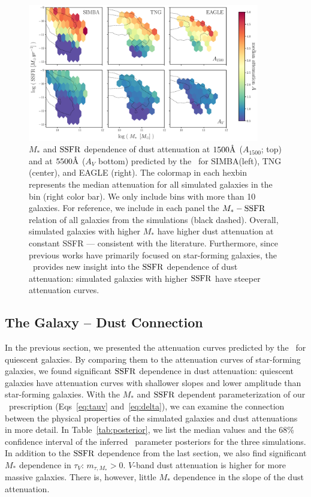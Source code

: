 \begin{figure}
\begin{center}
    \includegraphics[width=0.9\textwidth]{figs/abc_av_mssfr.pdf}
    \caption{\label{fig:avmsfr}
        $M_*$ and ${\rm SSFR}$ dependence of dust attenuation at $1500 \AA$
        ($A_{1500}$; top) and at $5500\AA$ ($A_{V}$ bottom) predicted by the
        \eda~for SIMBA(left), TNG (center), and EAGLE (right). The colormap in each hexbin 
        represents the median attenuation for all simulated galaxies in the
        bin (right color bar). We only include bins with more than 10 galaxies.
        For reference, we include in each panel the $M_*-{\rm SSFR}$ relation of
        all galaxies from the simulations (black dashed).
        Overall, simulated galaxies with higher $M_*$ have higher dust
        attenuation at constant SSFR --- consistent with the literature.
        Furthermore, since previous works have primarily focused on star-forming
        galaxies, the \eda~provides new insight into the ${\rm SSFR}$ dependence of
        dust attenuation: simulated galaxies with higher ${\rm SSFR}$ have steeper
        attenuation curves. 
    }
\end{center}
\end{figure}

\subsection{The Galaxy -- Dust Connection}  
In the previous section, we presented the attenuation curves predicted by
the \eda~for quiescent galaxies. 
By comparing them to the attenuation curves of star-forming galaxies, we
found significant ${\rm SSFR}$ dependence in dust attenuation: quiescent galaxies
have attenuation curves with shallower slopes and lower amplitude than
star-forming galaxies. 
With the $M_*$ and ${\rm SSFR}$ dependent parameterization of our
\eda~prescription (Eqs~\ref{eq:tauv} and~\ref{eq:delta}), we can examine
the connection between the physical properties of the simulated
galaxies and dust attenuations in more detail. 
In Table~\ref{tab:posterior}, we list the median values and the 68\%
confidence interval of the inferred \eda~parameter posteriors for the 
three simulations. 
In addition to the ${\rm SSFR}$ dependence from the last section, we also find
significant $M_*$ dependence in $\tau_V$: $m_{\tau,M_*} > 0$.
$V$-band dust attenuation is higher for more massive galaxies.  
There is, however, little $M_*$ dependence in the slope of the dust
attenuation.

